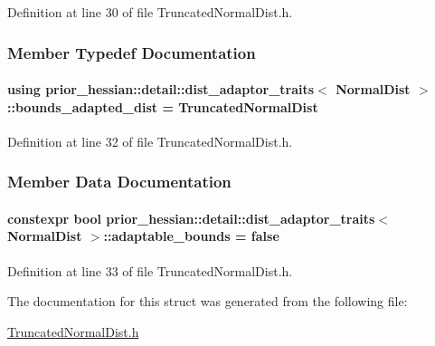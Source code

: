 Definition at line 30 of file Truncated\+Normal\+Dist.\+h.



\subsubsection{Member Typedef Documentation}
\paragraph[{\texorpdfstring{bounds\+\_\+adapted\+\_\+dist}{bounds_adapted_dist}}]{\setlength{\rightskip}{0pt plus 5cm}using {\bf prior\+\_\+hessian\+::detail\+::dist\+\_\+adaptor\+\_\+traits}$<$ {\bf Normal\+Dist} $>$\+::{\bf bounds\+\_\+adapted\+\_\+dist} =  {\bf Truncated\+Normal\+Dist}}\hypertarget{structprior__hessian_1_1detail_1_1dist__adaptor__traits_3_01NormalDist_01_4_a9ad536301ab3f3f186375df1c028f969}{}\label{structprior__hessian_1_1detail_1_1dist__adaptor__traits_3_01NormalDist_01_4_a9ad536301ab3f3f186375df1c028f969}


Definition at line 32 of file Truncated\+Normal\+Dist.\+h.



\subsubsection{Member Data Documentation}
\paragraph[{\texorpdfstring{adaptable\+\_\+bounds}{adaptable_bounds}}]{\setlength{\rightskip}{0pt plus 5cm}constexpr bool {\bf prior\+\_\+hessian\+::detail\+::dist\+\_\+adaptor\+\_\+traits}$<$ {\bf Normal\+Dist} $>$\+::adaptable\+\_\+bounds = false\hspace{0.3cm}{\ttfamily [static]}}\hypertarget{structprior__hessian_1_1detail_1_1dist__adaptor__traits_3_01NormalDist_01_4_a9ffe6b9190c25f3449fd3378bf21be66}{}\label{structprior__hessian_1_1detail_1_1dist__adaptor__traits_3_01NormalDist_01_4_a9ffe6b9190c25f3449fd3378bf21be66}


Definition at line 33 of file Truncated\+Normal\+Dist.\+h.



The documentation for this struct was generated from the following file\+:\begin{DoxyCompactItemize}
\item 
\hyperlink{TruncatedNormalDist_8h}{Truncated\+Normal\+Dist.\+h}\end{DoxyCompactItemize}
